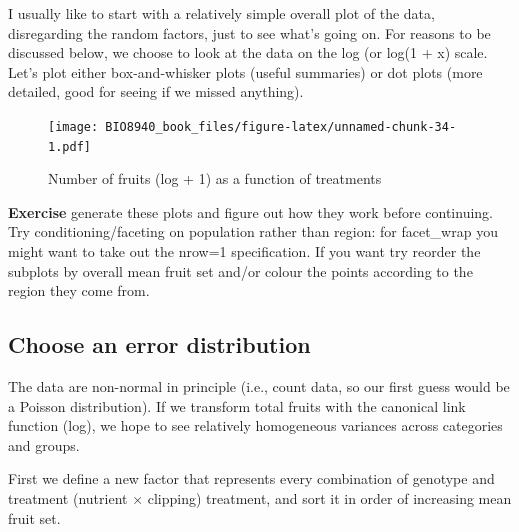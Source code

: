 \documentclass[
  12pt,
]{book}
\makeatletter
\newenvironment{Shaded}{\begin{snugshade}}{\end{snugshade}}
\newcommand{\DataTypeTok}[1]{\textcolor[rgb]{0.13,0.29,0.53}{#1}}
\newcommand{\KeywordTok}[1]{\textcolor[rgb]{0.13,0.29,0.53}{\textbf{#1}}}
\newcommand{\NormalTok}[1]{#1}
\newcommand{\OperatorTok}[1]{\textcolor[rgb]{0.81,0.36,0.00}{\textbf{#1}}}
\newcommand{\StringTok}[1]{\textcolor[rgb]{0.31,0.60,0.02}{#1}}
\newenvironment{kframe}{%
\medskip{}
\setlength{\fboxsep}{.8em}
\def\at@end@of@kframe{}%
\ifinner\ifhmode%
 \def\at@end@of@kframe{\end{minipage}}%
 \begin{minipage}{\columnwidth}%
\fi\fi%
\def\FrameCommand##1{\hskip\@totalleftmargin \hskip-\fboxsep
\colorbox{incolor}{##1}\hskip-\fboxsep
    \hskip-\linewidth \hskip-\@totalleftmargin \hskip\columnwidth}%
\MakeFramed {\advance\hsize-\width
  \@totalleftmargin\z@ \linewidth\hsize
  \@setminipage}}%
{\par\unskip\endMakeFramed%
\at@end@of@kframe}
\newenvironment{rmdblock}[1]
 {
 \begin{itemize}
 \renewcommand{\labelitemi}{
   \raisebox{-.7\height}[0pt][0pt]{
     {\setkeys{Gin}{width=3em,keepaspectratio}\texttt{[image: images/icons/\#1]}}
   }
 }
 \begin{kframe}
 \setlength{\fboxsep}{1em}
 \item
 }
 {
 \end{kframe}
 \end{itemize}
 }
\newenvironment{rmdcode}
  {\begin{rmdblock}{code}}
  {\end{rmdblock}}
\makeatother
\begin{document}
I usually like to start with a relatively simple overall plot of the data, disregarding the random factors, just to see what's going on. For reasons to be discussed below, we choose to look at the data on the log (or log(1 + x) scale. Let's plot either box-and-whisker plots (useful summaries) or dot plots (more detailed, good for seeing if we missed anything).

\begin{figure}
\centering
\texttt{[image: BIO8940\_book\_files/figure-latex/unnamed-chunk-34-1.pdf]}
\caption{\label{fig:unnamed-chunk-34}Number of fruits (log + 1) as a function of treatments}
\end{figure}

\begin{rmdcode}
\textbf{Exercise} generate these plots and figure out how they work before continuing. Try conditioning/faceting on population rather than region: for facet\_wrap you might want to take out the nrow=1 specification. If you want try reorder the subplots by overall mean fruit set and/or colour the points according to the region they come from.
\end{rmdcode}

\hypertarget{choose-an-error-distribution}{%
\subsection{Choose an error distribution}\label{choose-an-error-distribution}}

The data are non-normal in principle (i.e., count data, so our first guess would be a Poisson distribution). If we transform total fruits with the canonical link function (log), we hope to see relatively homogeneous variances across categories and groups.

First we define a new factor that represents every combination of genotype and treatment (nutrient × clipping) treatment, and sort it in order of increasing mean fruit set.

\begin{Shaded}
\end{Shaded}
\end{document}
